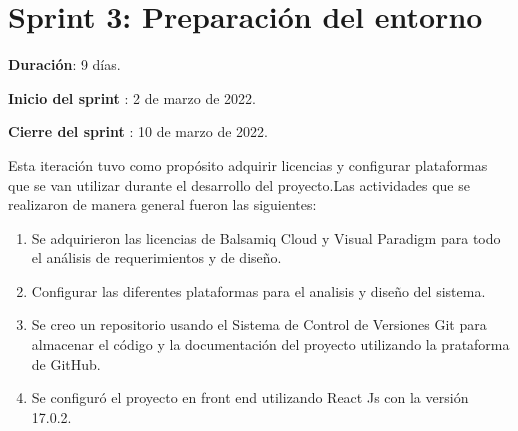 
\section{Sprint 3: Preparación del entorno}
    \begin{description}
        \item \textbf{Duración}: 9 días. 
        \item \textbf{Inicio del sprint }: 2 de marzo de 2022.
        \item \textbf{Cierre del sprint }: 10 de marzo de 2022.
    \end{description}
    
    Esta iteración tuvo como propósito adquirir licencias y configurar plataformas que se van utilizar
    durante el desarrollo del proyecto.Las actividades que se realizaron de manera general fueron las siguientes:
    \begin{enumerate}
        \item Se adquirieron las licencias de Balsamiq Cloud y Visual Paradigm  para todo el análisis de
        requerimientos y de diseño.
        \item Configurar las diferentes plataformas para el analisis y diseño del sistema.
        \item Se creo un repositorio usando el Sistema de Control de Versiones Git para almacenar el código y la documentación del proyecto
        utilizando la prataforma de GitHub.
        \item Se configuró el proyecto en front end utilizando React Js con la versión 17.0.2.
    \end{enumerate}
